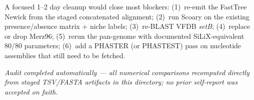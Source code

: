 \documentclass[11pt]{article}
\begin{document}
A focused 1--2 day cleanup would close most blockers: (1)~re-emit the FastTree Newick from the staged concatenated alignment; (2)~run Scoary on the existing presence/absence matrix + niche labels; (3)~re-BLAST VFDB \emph{setB}; (4)~replace or drop Merz96; (5)~rerun the pan-genome with documented SiLiX-equivalent 80/80 parameters; (6)~add a PHASTER (or PHASTEST) pass on nucleotide assemblies that still need to be fetched.

\vspace{1em}
\noindent{}

\vspace{2em}
\noindent\emph{Audit completed automatically --- all numerical comparisons recomputed directly from staged TSV/FASTA artifacts in this directory; no prior self-report was accepted on faith.}
\end{document}
